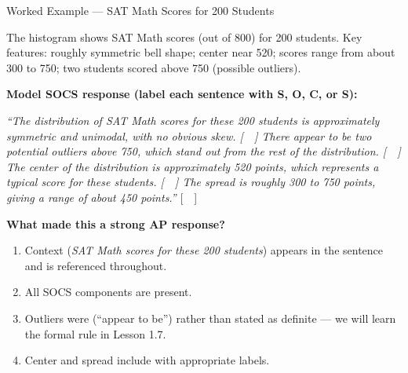 \documentclass[10pt]{article}
\begin{document}
\begin{notesbox}{Worked Example --- SAT Math Scores for 200 Students}
\small

\noindent The histogram shows SAT Math scores (out of 800) for 200 students.
Key features: roughly symmetric bell shape; center near 520; scores range from
about 300 to 750; two students scored above 750 (possible outliers).

\vspace{8pt}
\textbf{Model SOCS response (label each sentence with S, O, C, or S):}

\vspace{6pt}
\begin{tcolorbox}[colback=white, colframe=slate, boxrule=0.5pt, arc=2mm,
    left=3mm, right=3mm, top=3mm, bottom=3mm]
\textit{``The distribution of SAT Math scores for these 200 students is
approximately symmetric and unimodal, with no obvious skew.
[~\blank{0.5cm}~] There appear to be two potential outliers above 750,
which stand out from the rest of the distribution. [~\blank{0.5cm}~]
The center of the distribution is approximately 520 points, which represents
a typical score for these students. [~\blank{0.5cm}~] The spread is roughly
300 to 750 points, giving a range of about 450 points.''}
[~\blank{0.5cm}~]
\end{tcolorbox}

\vspace{8pt}
\textbf{What made this a strong AP response?}
\begin{enumerate}[leftmargin=1.5em, itemsep=3pt]
  \item Context (\textit{SAT Math scores for these 200 students}) appears in
        the \blank{2.5cm} sentence and is referenced throughout.
  \item All \blank{1cm} SOCS components are present.
  \item Outliers were \blank{2cm} (``appear to be'') rather than stated as
        definite --- we will learn the formal rule in Lesson 1.7.
  \item Center and spread include \blank{2cm} with appropriate labels.
\end{enumerate}

\end{notesbox}

\vspace{0.1in}
\end{document}
